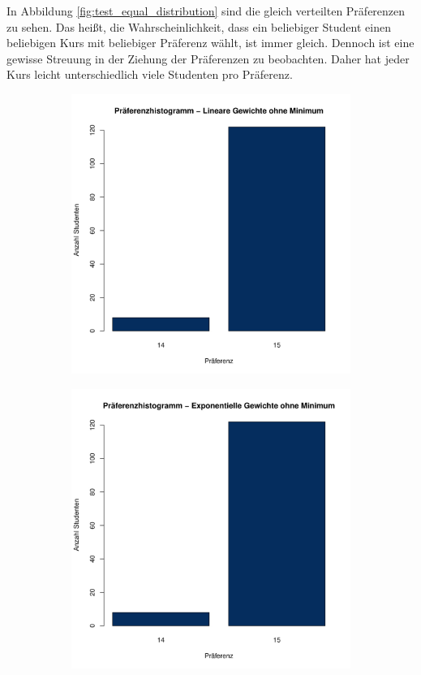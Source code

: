 			In Abbildung \ref{fig:test_equal_distribution} sind die gleich verteilten Präferenzen zu sehen.
			Das heißt, die Wahrscheinlichkeit, dass ein beliebiger Student einen beliebigen Kurs mit beliebiger Präferenz wählt, ist immer gleich.
			Dennoch ist eine gewisse Streuung in der Ziehung der Präferenzen zu beobachten.        
			Daher hat jeder Kurs leicht unterschiedlich viele Studenten pro Präferenz.
   	
			\begin{figure}
				\centering
				\begin{subfigure}{0.49\textwidth}
					\includegraphics[width=1.0\textwidth]{./testing/images/EqualDistPreferencesHistLin.jpg}
				\end{subfigure}
				\begin{subfigure}{0.49\textwidth}
					\includegraphics[width=1.0\textwidth]{./testing/images/EqualDistPreferencesHistExpo.jpg}

\end{subfigure}
\end{figure}
